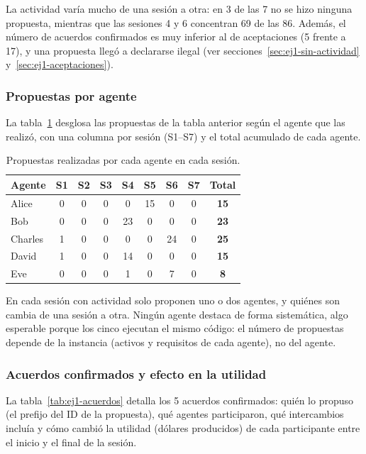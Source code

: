 La actividad varía mucho de una sesión a otra: en 3 de las 7 no se hizo ninguna propuesta, mientras
que las sesiones 4 y 6 concentran 69 de las 86. Además, el número de acuerdos confirmados es muy
inferior al de aceptaciones (5 frente a 17), y una propuesta llegó a declararse ilegal (ver
secciones~\ref{sec:ej1-sin-actividad} y~\ref{sec:ej1-aceptaciones}).

\subsubsection{Propuestas por agente}
\label{sec:ej1-por-agente}

La tabla~\ref{tab:ej1-por-agente} desglosa las propuestas de la tabla anterior según el agente que
las realizó, con una columna por sesión (S1--S7) y el total acumulado de cada agente.

\begin{table}[htbp]
  \centering
  \caption{Propuestas realizadas por cada agente en cada sesión.}
  \label{tab:ej1-por-agente}
  \begin{tabular}{lcccccccc}
    \toprule
    Agente & S1 & S2 & S3 & S4 & S5 & S6 & S7 & \textbf{Total} \\
    \midrule
    Alice   & 0 & 0 & 0 & 0  & 15 & 0  & 0 & \textbf{15} \\
    Bob     & 0 & 0 & 0 & 23 & 0  & 0  & 0 & \textbf{23} \\
    Charles & 1 & 0 & 0 & 0  & 0  & 24 & 0 & \textbf{25} \\
    David   & 1 & 0 & 0 & 14 & 0  & 0  & 0 & \textbf{15} \\
    Eve     & 0 & 0 & 0 & 1  & 0  & 7  & 0 & \textbf{8}  \\
    \bottomrule
  \end{tabular}
\end{table}

En cada sesión con actividad solo proponen uno o dos agentes, y quiénes son cambia de una sesión a
otra. Ningún agente destaca de forma sistemática, algo esperable porque los cinco ejecutan el mismo
código: el número de propuestas depende de la instancia (activos y requisitos de cada agente), no
del agente.

\subsubsection{Acuerdos confirmados y efecto en la utilidad}
\label{sec:ej1-acuerdos}

La tabla~\ref{tab:ej1-acuerdos} detalla los 5 acuerdos confirmados: quién lo propuso (el prefijo
del ID de la propuesta), qué agentes participaron, qué intercambios incluía y cómo cambió la utilidad
(dólares producidos) de cada participante entre el inicio y el final de la sesión.

